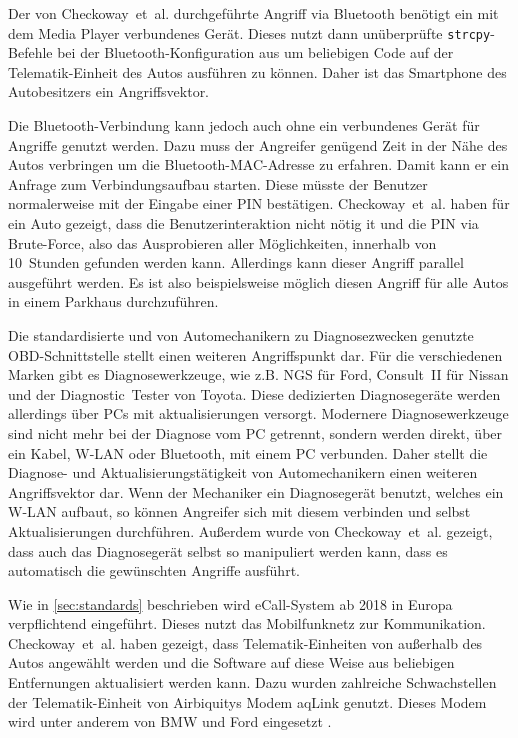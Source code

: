 Der von Checkoway~et~al. durchgeführte Angriff via Bluetooth benötigt ein
mit dem Media Player verbundenes Gerät. Dieses nutzt dann unüberprüfte
\verb+strcpy+-Befehle bei der Bluetooth-Konfiguration aus um beliebigen Code
auf der Telematik-Einheit des Autos ausführen zu können. Daher ist das
Smartphone des Autobesitzers ein Angriffsvektor.

Die Bluetooth-Verbindung kann jedoch auch ohne ein verbundenes Gerät für
Angriffe genutzt werden. Dazu muss der Angreifer genügend Zeit in der Nähe des
Autos verbringen um die Bluetooth-MAC-Adresse zu erfahren. Damit kann er ein
Anfrage zum Verbindungsaufbau starten. Diese müsste der Benutzer normalerweise
mit der Eingabe einer PIN bestätigen. Checkoway~et~al. haben für ein Auto
gezeigt, dass die Benutzerinteraktion nicht nötig it und die PIN via
Brute-Force, also das Ausprobieren aller Möglichkeiten, innerhalb von
10~Stunden gefunden werden kann. Allerdings kann dieser Angriff parallel
ausgeführt werden. Es ist also beispielsweise möglich diesen Angriff für alle
Autos in einem Parkhaus durchzuführen.

Die standardisierte und von Automechanikern zu Diagnosezwecken genutzte
OBD-Schnittstelle stellt einen weiteren Angriffspunkt dar. Für die
verschiedenen Marken gibt es Diagnosewerkzeuge, wie z.B. NGS für Ford,
Consult~II für Nissan und der Diagnostic~Tester von Toyota. Diese dedizierten
Diagnosegeräte werden allerdings über PCs mit aktualisierungen versorgt.
Modernere Diagnosewerkzeuge sind nicht mehr bei der Diagnose vom PC getrennt,
sondern werden direkt, über ein Kabel, W-LAN oder Bluetooth, mit einem PC
verbunden. Daher stellt die Diagnose- und Aktualisierungstätigkeit von
Automechanikern einen weiteren Angriffsvektor dar. Wenn der Mechaniker ein
Diagnosegerät benutzt, welches ein W-LAN aufbaut, so können Angreifer sich
mit diesem verbinden und selbst Aktualisierungen durchführen. Außerdem wurde
von Checkoway~et~al. gezeigt, dass auch das Diagnosegerät selbst so manipuliert
werden kann, dass es automatisch die gewünschten Angriffe ausführt.

Wie in \cref{sec:standards} beschrieben wird eCall-System ab 2018 in Europa
verpflichtend eingeführt. Dieses nutzt das Mobilfunknetz zur Kommunikation.
Checkoway~et~al. haben gezeigt, dass Telematik-Einheiten von außerhalb des
Autos angewählt werden und die Software auf diese Weise aus beliebigen
Entfernungen aktualisiert werden kann. Dazu wurden zahlreiche Schwachstellen
der Telematik-Einheit von Airbiquitys Modem aqLink genutzt. Dieses Modem wird
unter anderem von BMW und Ford eingesetzt \cite{AirbiquityBMW,AirbiquityFord}.

